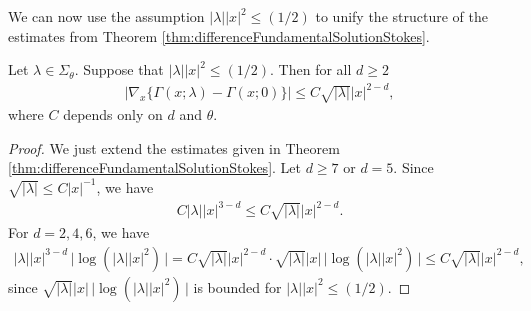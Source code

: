 We can now use the assumption $|\lambda||x|^2 \leq ({1}/{2})$  to unify the structure of the estimates from Theorem \ref{thm:differenceFundamentalSolutionStokes}.
\begin{cor}
  \label{cor:differenceFundamentalSolutionStokes}
  Let $\lambda \in \Sigma_\theta$. Suppose that $|\lambda||x|^2 \leq ({1}/{2})$.
  Then for all $d \geq 2$
  \begin{align*}
    \big|\nabla_x\{ \Gamma(x; \lambda) - \Gamma(x; 0)\} \big| \leq C \sqrt{|\lambda|} |x|^{2 - d},
  \end{align*}
  where $C$ depends only on $d$ and $\theta$.
\end{cor}

\begin{proof}
  We just extend the estimates given in Theorem \ref{thm:differenceFundamentalSolutionStokes}.
  Let $d \geq 7$ or $d = 5$. Since $\sqrt{|\lambda|} \leq C{|x|}^{-1}$, we have
  \begin{align*}
    C |\lambda| |x|^{3 - d} \leq C \sqrt{|\lambda|} |x|^{2 - d}.
  \end{align*}
  For $d = 2,4,6$, we have
  \begin{align*}
    |\lambda| |x|^{3 - d} \, \big| \log(|\lambda||x|^2)\,\big|
    = C \sqrt{|\lambda|} |x|^{2 - d} \cdot \sqrt{|\lambda|} |x|\, \big| \log(|\lambda| |x|^2)\, \big|
    \leq C \sqrt{|\lambda|} |x|^{2 - d},
  \end{align*}
  since $\sqrt{|\lambda|} |x| \,\big|\log(|\lambda| |x|^2)\,\big|$ is bounded for $|\lambda| |x|^2 \leq ({1}/{2})$.
\end{proof}

